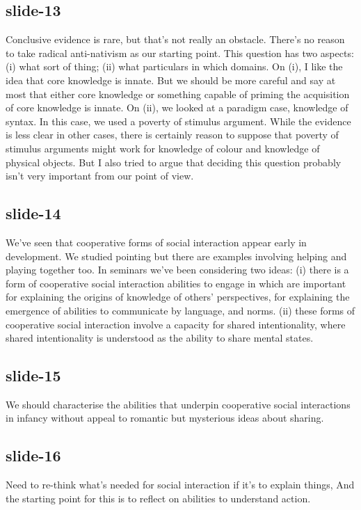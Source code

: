 \documentclass[12pt,\papersize]{extarticle}
\begin{document}
 
\subsection{slide-13}
Conclusive evidence is rare, but that's not really an obstacle.
There's no reason to take radical anti-nativism as our starting point.
This question has two aspects: (i) what sort of thing; (ii) what particulars in which domains.
On (i), I like the idea that core knowledge is innate.
But we should be more careful and say at most that either core knowledge or something capable of priming the acquisition of core knowledge is innate.
On (ii), we looked at a paradigm case, knowledge of syntax.
In this case, we used a poverty of stimulus argument.
While the evidence is less clear in other cases, there is certainly reason to suppose that poverty of stimulus arguments might work for knowledge of colour and knowledge of physical objects.
But I also tried to argue that deciding this question probably isn't very important from our point of view.
 
 
\subsection{slide-14}
We've seen that cooperative forms of social interaction appear early in development.
We studied pointing but there are examples involving helping and playing together too.
In seminars we've been considering two ideas:
(i) there is a form of cooperative social interaction abilities to engage in which are important for explaining the origins of knowledge of others' perspectives, for explaining the emergence of abilities to communicate by language, and norms.
(ii) these forms of cooperative social interaction involve a capacity for shared intentionality,
where shared intentionality is understood as the ability to share mental states.
 
 
\subsection{slide-15}
We should characterise the abilities that underpin cooperative social interactions in infancy without appeal to romantic but mysterious ideas about sharing.
 
 
\subsection{slide-16}
Need to re-think what's needed for social interaction if it's to explain things,
And the starting point for this is to reflect on abilities to understand action.
 
\end{document}
